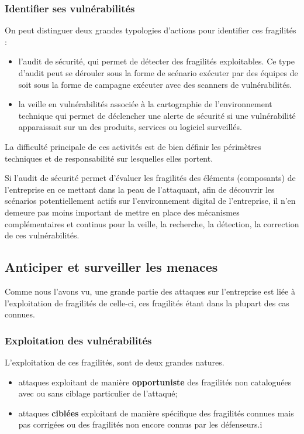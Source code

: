 \begin{frame}
\frametitle<presentation>{Identifier ses vulnérabilités}
On peut distinguer deux grandes typologies d'actions pour identifier ces fragilités :
\begin{itemize}
	\item l'audit de sécurité, qui permet de détecter des fragilités exploitables. Ce type d'audit peut se dérouler sous la forme de scénario exécuter par des équipes de  soit sous la forme de campagne exécuter avec des scanners de vulnérabilités.
	\item la veille en vulnérabilités associée à la cartographie de l'environnement technique qui permet de déclencher une alerte de sécurité si une vulnérabilité apparaissait sur un des produits, services ou logiciel surveillés.
\end{itemize}
\end{frame}

La difficulté principale de ces activités est de bien définir les périmètres techniques et de responsabilité sur lesquelles elles portent.

Si l'audit de sécurité permet d'évaluer les fragilités des éléments (composants) de l'entreprise en ce mettant dans la peau de l'attaquant, afin de découvrir les scénarios potentiellement actifs sur l'environnement digital de l'entreprise, il n'en demeure pas moins important de mettre en place des mécanismes complémentaires et continus pour la veille, la recherche, la détection, la correction de ces vulnérabilités.


\subsection{Anticiper et surveiller les menaces }

Comme nous l'avons vu, une grande partie des attaques sur l'entreprise est liée à l'exploitation de fragilités de celle-ci, ces fragilités étant dans la plupart des cas connues.  

\begin{frame}
\frametitle<presentation>{Exploitation des vulnérabilités}
L'exploitation de ces fragilités, sont de deux grandes natures.
\begin{itemize}
	\item attaques exploitant de manière \textbf{opportuniste} des fragilités non cataloguées  avec ou sans ciblage particulier de l'attaqué;
	\item attaques \textbf{ciblées} exploitant de manière spécifique des fragilités connues mais pas corrigées ou des fragilités non encore connus par les défenseurs.i
\end{itemize}
\end{frame}

